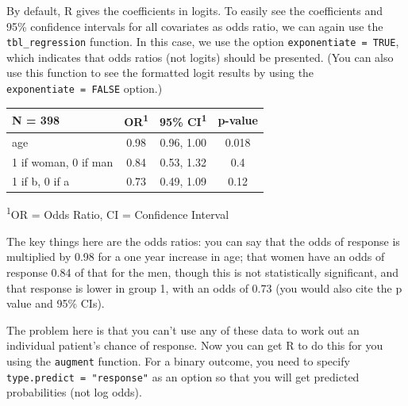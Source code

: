 \documentclass[]{book}
\newenvironment{Shaded}{\begin{snugshade}}{\end{snugshade}}
\newcommand{\DataTypeTok}[1]{\textcolor[rgb]{0.13,0.29,0.53}{#1}}
\newcommand{\KeywordTok}[1]{\textcolor[rgb]{0.13,0.29,0.53}{\textbf{#1}}}
\newcommand{\NormalTok}[1]{#1}
\newcommand{\OperatorTok}[1]{\textcolor[rgb]{0.81,0.36,0.00}{\textbf{#1}}}
\newcommand{\OtherTok}[1]{\textcolor[rgb]{0.56,0.35,0.01}{#1}}
\newcommand{\StringTok}[1]{\textcolor[rgb]{0.31,0.60,0.02}{#1}}
\begin{document}
By default, R gives the coefficients in logits. To easily see the
coefficients and 95\% confidence intervals for all covariates as odds
ratio, we can again use the \texttt{tbl\_regression} function. In this
case, we use the option \texttt{exponentiate\ =\ TRUE}, which indicates
that odds ratios (not logits) should be presented. (You can also use
this function to see the formatted logit results by using the
\texttt{exponentiate\ =\ FALSE} option.)

\begin{Shaded}
\end{Shaded}

\captionsetup[table]{labelformat=empty,skip=1pt}
\begin{longtable}{lccc}
\toprule
\textbf{N = 398} & \textbf{OR}\textsuperscript{1} & \textbf{95\% CI}\textsuperscript{1} & \textbf{p-value} \\ 
\midrule
age & 0.98 & 0.96, 1.00 & 0.018 \\ 
1 if woman, 0 if man & 0.84 & 0.53, 1.32 & 0.4 \\ 
1 if b, 0 if a & 0.73 & 0.49, 1.09 & 0.12 \\ 
\bottomrule
\end{longtable}
\vspace{-5mm}
\begin{minipage}{\linewidth}
\textsuperscript{1}OR = Odds Ratio, CI = Confidence Interval \\ 
\end{minipage}

The key things here are the odds ratios: you can say that the odds of
response is multiplied by 0.98 for a one year increase in age; that
women have an odds of response 0.84 of that for the men, though this is
not statistically significant, and that response is lower in group 1,
with an odds of 0.73 (you would also cite the p value and 95\% CIs).

The problem here is that you can't use any of these data to work out an
individual patient's chance of response. Now you can get R to do this
for you using the \texttt{augment} function. For a binary outcome, you
need to specify \texttt{type.predict\ =\ "response"} as an option so
that you will get predicted probabilities (not log odds).
\end{document}
